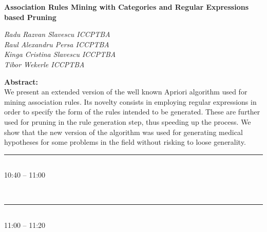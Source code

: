 \noindent 
{\bf \small Association Rules Mining with Categories and Regular Expressions based Pruning} 
\nopagebreak

\noindent 
{\it \footnotesize
\noindent Radu Razvan Slavescu \hfill ICCPTBA \\
Raul Alexandru Persa \hfill ICCPTBA\\ 
Kinga Cristina Slavescu \hfill ICCPTBA \\
Tibor Wekerle \hfill ICCPTBA \\
} 

\nopagebreak

\noindent 
{\bf \small Abstract:} \\
{\small
We present an extended version of the well known Apriori algorithm used for mining association rules. 
Its novelty consists in employing regular expressions in order to specify the form of the rules intended to be generated.
These are further used for pruning in the rule generation step, thus speeding up the process. 
We show that the new version of the algorithm was used for generating medical hypotheses for some problems in the field without risking to loose generality.
}
            \\ 
            \noindent\rule{\textwidth}{0.4pt}

\vspace*{-36pt}\subsection[ 
    	   {\bf Concept Extraction from Medical Documents. A Contextual Approach
           } \\
           {\it Gyorgy Szenasi, Camelia Lemnaru, Ioana Barbantan
           }
	]
	    {
            }
	    10:40 -- 11:00\nopagebreak
	    
            
            \\ 
            \noindent\rule{\textwidth}{0.4pt}
\vspace*{-36pt}\subsection[ 
    	   {\bf Building Annotation Rules for Text Description of Endoscopies in Romanian - an NLP-free approach
           } \\
           {\it Radu Razvan Slavescu, Alexandra Bali, Kinga Cristina Slavescu
           }
	]
	    {
            }
	    11:00 -- 11:20\nopagebreak
	    
